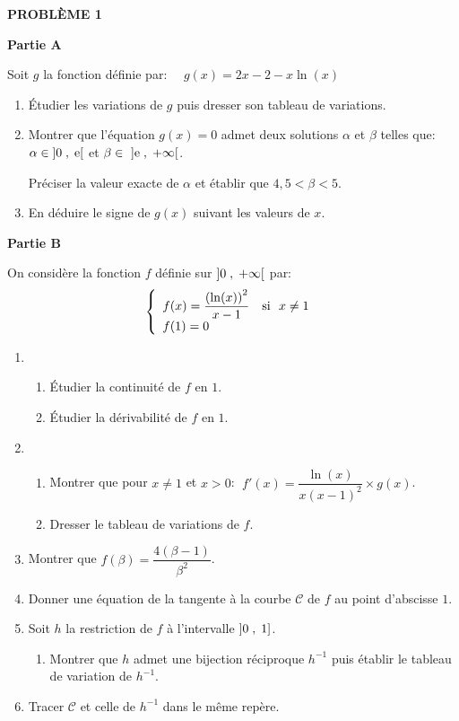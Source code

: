 



 
	
\textbf{PROBLÈME 1} 


\textbf{Partie A}

\medskip
Soit $ g $ la fonction définie par:
$\quad  g(x)=2x-2-x\ln(x) $
\begin{enumerate}
\item Étudier  les variations de $ g $ puis dresser son tableau de variations.
\item Montrer que l'équation $ g(x)=0 $ admet deux solutions $ \alpha $ et $ \beta $  telles que: $ \alpha\in\left]0 \;,\; \mathrm{e}\right[ $ et  $ \beta \in~\left]\mathrm{e} \;,\; +\infty\right[ $.

 Préciser la valeur exacte de $ \alpha $  et établir que $ 4,5<\beta <5 $.
\item  En déduire le signe de $ g(x)$ suivant les valeurs de $ x $.
\end{enumerate}

\textbf{Partie B}


\medskip
On considère la fonction $ f $ définie   sur $ \left]0 \;,\; +\infty\right[ $ par:    $$\left \{\begin{array}{l} f(x)=\dfrac{\left(\ln(x)\right)^{2}}{x-1}~~~ \textrm{si}~~ x\neq 1 ~\\ f(1)=0\end{array}\right.$$
 \begin{enumerate}
\item 
\begin{enumerate}
\item Étudier la continuité de $ f $  en $ 1 $.
\item Étudier la dérivabilité de $ f $  en $ 1 $.
\end{enumerate}
\item
\begin{enumerate}
\item Montrer que pour $ x\neq1 $ et $ x>0 $: $\; f'(x)=\dfrac{\ln(x)}{x(x-1)^{2}}\times g(x) $.
\item  Dresser le tableau de variations de $ f $.
\end{enumerate}
\item Montrer que $ f(\beta)=\dfrac{4(\beta-1)}{\beta^{2}} $.
\item Donner une équation de la tangente à la courbe $\mathscr{C}$  de $ f $ au point d'abscisse $ 1 $.
\item Soit $ h $ la restriction de $ f $ à l'intervalle $ \left]0 \;, \;1\right] $. 
\begin{enumerate}
\item Montrer que $ h $ admet une bijection réciproque $ h^{-1} $ puis établir le tableau de variation de  $ h^{-1} $.

\end{enumerate}
\item Tracer $\mathscr{C}$ et celle de $ h^{-1} $  dans le même repère.
\end{enumerate}


